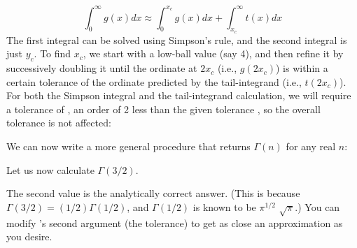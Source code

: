 $$
\int_0^{\infty} g(x) dx \approx 
\int_0^{x_c} g(x) dx +
\int_{x_c}^{\infty} t(x) dx 
$$
%
The first integral can be solved using Simpson’s rule,
and the second integral is just $y_c$.  To find $x_c$,
we start with a low-ball value (say 4), and then refine
it by successively doubling it until the ordinate at
$2x_c$ (i.e., $g(2x_c)$) is within a certain
tolerance of the ordinate predicted by the tail-integrand 
(i.e., $t(2x_c)$).  For both the Simpson
integral and the tail-integrand calculation, we will
require a tolerance of , an order of 2 less than
the given tolerance , so the overall
tolerance is not affected:


\n We can now write a more general procedure 
that returns $\Gamma(n)$ for any real $n$:


\n
Let us now calculate $\Gamma(3/2)$.


\n The second value is the analytically correct answer.
(This is because $\Gamma(3/2) =
(1/2)\Gamma(1/2)$, and $\Gamma(1/2)$ is known to be
\ifx\shipout\UNDEFINED
$\pi^{1/2}$\else
$\sqrt{\pi}$\fi.)
You can modify ’s  second
argument (the tolerance) to get as close an
approximation as you desire.




